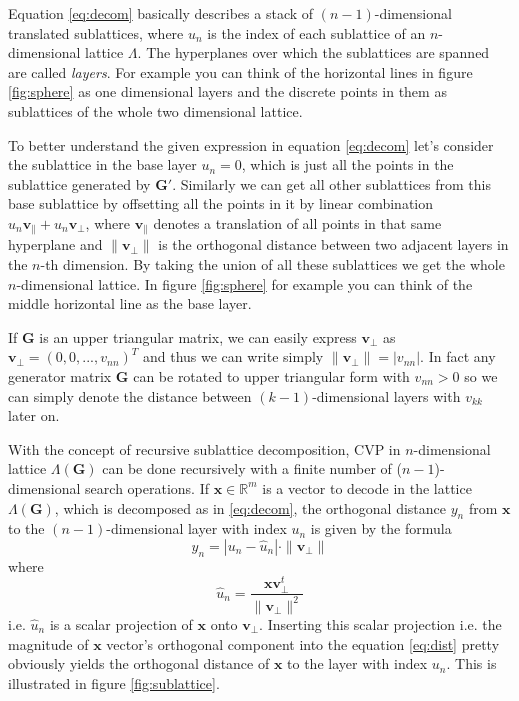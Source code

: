 \documentclass[english,12pt,a4paper,pdftex,sci,utf8]{aaltothesis}
\begin{document}
\noindent Equation \eqref{eq:decom} basically describes a stack of $(n-1)$-dimensional translated sublattices, where $u_n$ is the index of each sublattice of an $n$-dimensional lattice $\Lambda$. The hyperplanes over which the sublattices are spanned are called \textit{layers}. For example you can think of the horizontal lines in figure \ref{fig:sphere} as one dimensional layers and the discrete points in them as sublattices of the whole two dimensional lattice.
\par To better understand the given expression in equation \eqref{eq:decom} let's consider the sublattice in the base layer $u_n = 0$, which is just all the points in the sublattice generated by $\mathbf{G}'$. Similarly we can get all other sublattices from this base sublattice by offsetting all the points in it by linear combination $u_n\mathbf{v}_{\parallel}+u_n\mathbf{v}_{\bot}$, where $\mathbf{v}_{\parallel}$ denotes a translation of all points in that same hyperplane and $\|\mathbf{v}_{\bot}\|$ is the orthogonal distance between two adjacent layers in the $n$-th dimension. By taking the union of all these sublattices we get the whole $n$-dimensional lattice. In figure \ref{fig:sphere} for example you can think of the middle horizontal line as the base layer.
\par If $\mathbf{G}$ is an upper triangular matrix, we can easily express $\mathbf{v}_{\bot}$ as $\mathbf{v}_{\bot} = (0, 0, ..., v_{nn})^T$ and thus we can write simply $\|\mathbf{v}_{\bot}\| = |v_{nn}|$. In fact any generator matrix $\mathbf{G}$ can be rotated to upper triangular form \cite{agrell} with $v_{nn} > 0$ so we can simply denote the distance between $(k-1)$-dimensional layers with $v_{kk}$ later on.
\par With the concept of recursive sublattice decomposition, CVP in $n$-dimensional lattice $\Lambda(\mathbf{G})$ can be done recursively with a finite number of ($n-1$)-dimensional search operations. If $\mathbf{x} \in \mathbb{R}^m$ is a vector to decode in the lattice $\Lambda(\mathbf{G})$, which is decomposed as in \eqref{eq:decom}, the orthogonal distance $y_n$ from $\mathbf{x}$ to the $(n-1)$-dimensional layer with index $u_n$ is given by the formula
\begin{equation}
y_n = |u_n-\hat{u}_n| \cdot \|\mathbf{v}_{\bot}\|
\label{eq:dist}
\end{equation}
where
\begin{equation}
\hat{u}_n = \frac{\mathbf{xv}_{\bot}^t}{\|\mathbf{v}_{\bot}\|^2}
\label{eq:uhat}
\end{equation}
i.e. $\hat{u}_n$ is a scalar projection of $\mathbf{x}$ onto $\mathbf{v}_{\bot}$. %
Inserting this scalar projection i.e. the magnitude of $\mathbf{x}$ vector's orthogonal component %
into the equation \eqref{eq:dist} pretty obviously yields the orthogonal distance of $\mathbf{x}$ to the layer with index $u_n$. This is illustrated in figure \ref{fig:sublattice}.
\end{document}
